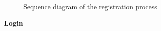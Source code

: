 \documentclass[12pt,titlepage]{article}
\begin{document}
\begin{figure}
\centering
{}
\caption{Sequence diagram of the registration process}
\end{figure}

\clearpage
\newpage


\begin{flushleft}
\textbf{Login} 
\end{flushleft}
\end{document}
